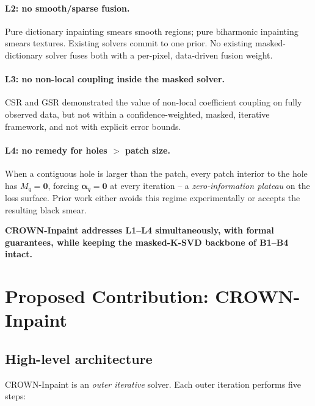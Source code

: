 \documentclass[11pt,a4paper]{article}
\theoremstyle{definition}
\theoremstyle{remark}
\newcommand{\alphavec}{\bm{\alpha}}
\begin{document}
\paragraph{L2: no smooth/sparse fusion.}
Pure dictionary inpainting smears smooth regions; pure biharmonic
inpainting smears textures. Existing solvers commit to one prior. No
existing masked-dictionary solver fuses both with a per-pixel,
data-driven fusion weight.

\paragraph{L3: no non-local coupling inside the masked solver.}
CSR and GSR demonstrated the value of non-local coefficient coupling on
fully observed data, but not within a confidence-weighted, masked,
iterative framework, and not with explicit error bounds.

\paragraph{L4: no remedy for holes $>$ patch size.}
When a contiguous hole is larger than the patch, every patch interior
to the hole has $M_q=\bm{0}$, forcing $\alphavec_q=\bm{0}$ at every
iteration -- a \emph{zero-information plateau} on the loss surface.
Prior work either avoids this regime experimentally or accepts the
resulting black smear.

\medskip\noindent
\textbf{CROWN-Inpaint addresses L1--L4 simultaneously, with formal
guarantees, while keeping the masked-K-SVD backbone of B1--B4 intact.}

\section{Proposed Contribution: CROWN-Inpaint}
\label{sec:proposal}

\subsection{High-level architecture}

CROWN-Inpaint is an \emph{outer iterative} solver. Each outer iteration
performs five steps:
\end{document}
